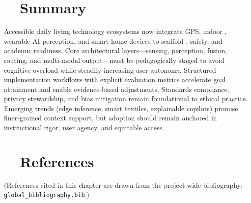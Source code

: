 \section{~~Summary}\label{ch8:sec:summary}
Accessible daily living technology ecosystems now integrate GPS, indoor , wearable AI perception, and smart home devices to scaffold , safety, and academic readiness. Core architectural layers—sensing, perception, fusion, routing, and multi-modal output—must be pedagogically staged to avoid cognitive overload while steadily increasing user autonomy.\supercite{AFBGPS2023, WeWALK, navilens} Structured implementation workflows with explicit evaluation metrics accelerate goal attainment and enable evidence-based adjustments.\supercite{StudentOutcomesResearch} Standards compliance, privacy stewardship, and bias mitigation remain foundational to ethical practice.\supercite{Section508, AI_Ethics_Bias, DataPrivacyAI} Emerging trends (edge inference, smart textiles, explainable copilots) promise finer-grained context support, but adoption should remain anchored in instructional rigor, user agency, and equitable access.

\section{~~References}\label{ch8:sec:references}
\noindent (References cited in this chapter are drawn from the project-wide bibliography: \texttt{global\_bibliography.bib}.)

